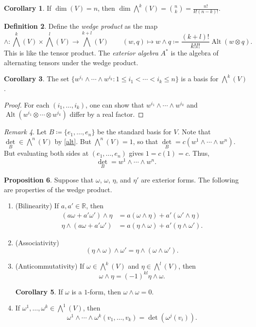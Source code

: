 \documentclass[10pt,letterpaper,cm]{nupset}
\theoremstyle{definition}
\newtheorem{definition}{Definition}[subsection]
\theoremstyle{theorem}
\newtheorem{prop}[definition]{Proposition}
\newtheorem{corollary}[definition]{Corollary}
\theoremstyle{remark}
\newtheorem{remark}[definition]{Remark}
\newcommand{\R}{\mathbb R}
\newcommand{\1}{\mathbf{1}}
\newcommand{\0}{\vec 0}
\DeclareMathOperator{\Alt}{Alt}
\begin{document}
\begin{corollary}
If $\dim(V) = n$, then $\dim \bigwedge^k(V) = {n\choose k} = \frac{n!}{k!(n-k)!}$.
\end{corollary}

\begin{definition}
Define the \textit{wedge product} as the map $$\wedge : \bigwedge^k(V) \times \bigwedge^l(V) \to \bigwedge^{k+l}(V) \quad \quad (w, q) \mapsto w \wedge q \coloneqq  \frac{(k+l)!}{k! l!}\Alt(w\otimes q).$$  This is like the tensor product. The \textit{exterior algebra} $A^{\ast}$ is the algebra of alternating tensors under the wedge product.
\end{definition}

\begin{corollary}
The set $\{w^{i_1} \wedge \cdots \wedge w^{i_k}  : 1 \leq i_1 < \cdots < i_k \leq n\}$ is a basis for $\bigwedge^k(V)$.
\end{corollary}
\begin{proof}
For each $(i_1, \ldots, i_k)$, one can show that $w^{i_1} \wedge \cdots \wedge w^{i_k}$ and $\Alt(w^{i_1} \otimes \cdots \otimes w^{i_k} )$ differ by a real factor.
\end{proof}

\begin{remark}
Let $B\coloneqq  \{e_1, \ldots, e_n\}$ be the standard basis for $V$. Note that $\underset{B}{\det} \in \bigwedge^n(V)$ by \cref{alt}.
But $\bigwedge^n(V) = 1$, so that $\underset{B}{\det} = c(w^1 \wedge \cdots \wedge w^n)$. But evaluating both sides at $(e_1, \ldots, e_n)$ gives $1 = c(1) = c$. Thus, $$\underset{B}{\det} = w^1 \wedge \cdots \wedge w^n.$$
\end{remark}

\begin{prop} Suppose that $\omega$, $\omega$, $\eta$, and $\eta'$ are exterior forms. The following are properties of the wedge product.
\begin{enumerate}
\item{(Bilinearity)} If $a, a' \in \R$, then 
\begin{align*}
(a\omega + a'\omega ')\wedge \eta &= a(\omega \wedge \eta) + a'(\omega' \wedge \eta)   \\   \eta \wedge (a\omega + a'\omega ') &= a(\eta \wedge \omega) + a'(\eta \wedge \omega' ). 
\end{align*}
\item{(Associativity)} $$(\eta \wedge \omega) \wedge \omega' =    \eta \wedge (\omega \wedge \omega') .$$
\item{(Anticommutativity)} If $\omega \in \bigwedge^k(V)$ and $\eta \in \bigwedge^l(V)$, then $$\omega \wedge \eta = (-1)^{kl}\eta \wedge \omega.   $$
\begin{corollary}
If $\omega$ is a $1$-form, then $\omega \wedge \omega = 0$.
\end{corollary}
\item If $\omega^1, \ldots, \omega^k \in \bigwedge^1(V)$, then $$ \omega^1 \wedge \cdots \wedge \omega^k(v_1, \ldots, v_k) =\det(\omega^j(v_i)). $$
\end{enumerate}
\end{prop}
\end{document}
